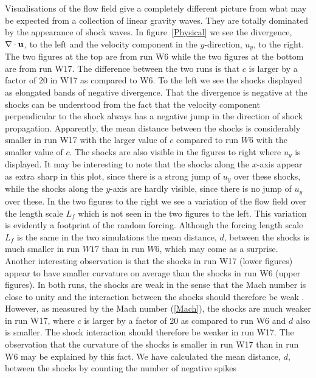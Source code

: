 \documentclass{jfm}
\begin{document}
Visualisations of the flow field give a completely different picture from what
may be expected from a collection of linear gravity waves. They are totally
dominated by the appearance of shock waves. In figure~\ref{Physical} we see
the divergence, $ \nabla \cdot {\bf u} $, to the left and the velocity
component in the $ y $-direction, $ u_y $, to the right. The two figures at the
top are from run W6 while the two figures at the bottom are from run W17. The
difference between the two runs is that $ c $ is larger by a factor of $ 20 $
in W17 as compared to W6. To the left we see the shocks displayed as elongated
bands of negative divergence. That the divergence is negative at the shocks can
be understood from the fact that the velocity component perpendicular to the
shock always has a negative jump in the direction of shock propagation.
Apparently, the mean distance between the shocks is considerably smaller in run
W17 with the larger value of $ c $ compared to run $ W6 $ with the smaller
value of $ c $. 
The shocks are also visible in the figures to right where $ u_y
$ is displayed. It may be interesting to note that the shocks along the $ x
$-axis appear as extra sharp in this plot, since there is a strong jump of $
u_{y} $ over these shocks, while the shocks along the $ y $-axis are hardly
visible, since there is no jump of $ u_{y} $ over these. In the two figures to
the right we see a variation of the flow field over the length scale $ L_f $
which is not seen in the two figures to the left. This variation is evidently a
footprint of the random forcing. Although the forcing length scale $ L_f $ is
the same in the two simulations the mean distance, $ d $, between the shocks is
much smaller in run $ W17 $ than in run $ W6 $, which may come as a surprise. Another interesting observation is that the shocks in run W17 (lower figures) appear to have smaller curvature on average than the shocks in run W6 (upper figures). In both runs, the shocks are weak in the sense that the Mach number is close to unity and the interaction between the shocks should therefore be weak \cite[see][]{ApazidisEliasson2018}. However, as measured by the Mach number  (\ref{Mach}), the shocks are much weaker in run W17, where $ c $ is larger by a factor of 20 as compared to run W6 and $ d $ also is smaller. The shock interaction should therefore be weaker in run W17. The observation that the curvature of the shocks is smaller in run W17 than in run W6 may be explained by this fact. 
We have calculated  the mean distance, $ d $, between the shocks by counting the number of negative spikes
\end{document}
